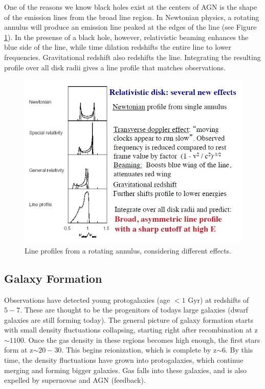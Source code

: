 One of the reasons we know black holes exist at the centers of AGN is 
the shape of the emission lines from the broad line region.  In Newtonian 
physics, a rotating annulus will produce an emission line peaked at the edges 
of the line (see Figure \ref{fig:line}).  In the presense of a black hole, 
however, relativistic beaming 
enhances the blue side of the line, while time dilation redshifts the 
entire line to lower frequencies.  Gravitational redshift also redshifts the 
line.  Integrating the resulting profile over all disk radii gives a line 
profile that matches observations.  

\begin{figure}[!h]
\begin{center}
\includegraphics[width=\textwidth]{line.jpg}
\end{center}
\caption{Line profiles from a rotating annulus, considering different effects.  
\label{fig:line}}
\end{figure}

\subsection{Galaxy Formation}
Observations have detected young protogalaxies (age $<1$ Gyr) at redshifts 
of $5-7$.  These are thought to be the progenitors of todays 
large galaxies (dwarf galaxies are still forming today).  The general picture 
of galaxy formation starts with small density fluctuations collapsing, starting 
right after recombination at z$\sim1100$.  Once the gas density in these 
regions becomes high enough, the first stars form at z$\sim20-30$.  
This begins reionization, which is complete by z$\sim6$.  By this time, 
the density fluctuations have grown into protogalaxies, which continue merging 
and forming bigger galaxies.  Gas falls into these galaxies, and is 
also expelled by supernovae and AGN (feedback).  

